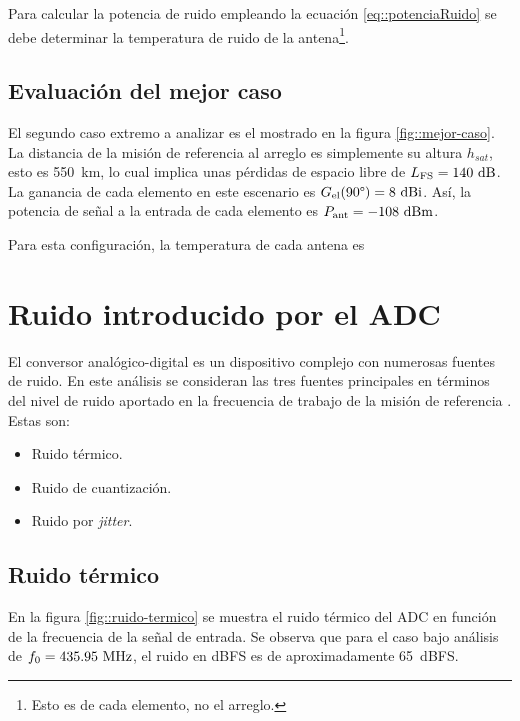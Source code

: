 \documentclass[../../main.tex]{subfiles}
\begin{document}
Para calcular la potencia de ruido empleando la ecuación \ref{eq::potenciaRuido} se debe determinar la temperatura de ruido de la antena\footnote{Esto es de cada elemento, no el arreglo.}.

\subsection{Evaluación del mejor caso}
El segundo caso extremo a analizar es el mostrado en la figura \ref{fig::mejor-caso}. La distancia de la misión de referencia al arreglo es simplemente su altura $h_{sat}$, esto es 550~km, lo cual implica unas pérdidas de espacio libre de $L_\textrm{FS} = 140~\textrm{dB}$. La ganancia de cada elemento en este escenario es $G_\textrm{el}(90\degree) = 8~\textrm{dBi}$. Así, la potencia de señal a la entrada de cada elemento es $P_\textrm{ant} = -108~\textrm{dBm}$.

Para esta configuración, la temperatura de cada antena es

\section{Ruido introducido por el ADC}
El conversor analógico-digital es un dispositivo complejo con numerosas fuentes de ruido. En este análisis se consideran las tres fuentes principales en términos del nivel de ruido aportado en la frecuencia de trabajo de la misión de referencia \cite{AD9249}. Estas son:
\begin{itemize}
    \item Ruido térmico.
    \item Ruido de cuantización.
    \item Ruido por \textit{jitter}.
\end{itemize}

\subsection{Ruido térmico}
En la figura \ref{fig::ruido-termico} se muestra el ruido térmico del ADC en función de la frecuencia de la señal de entrada. Se observa que para el caso bajo análisis de $f_0 = 435.95~\textrm{MHz}$, el ruido en dBFS es de aproximadamente 65~dBFS.
\end{document}
